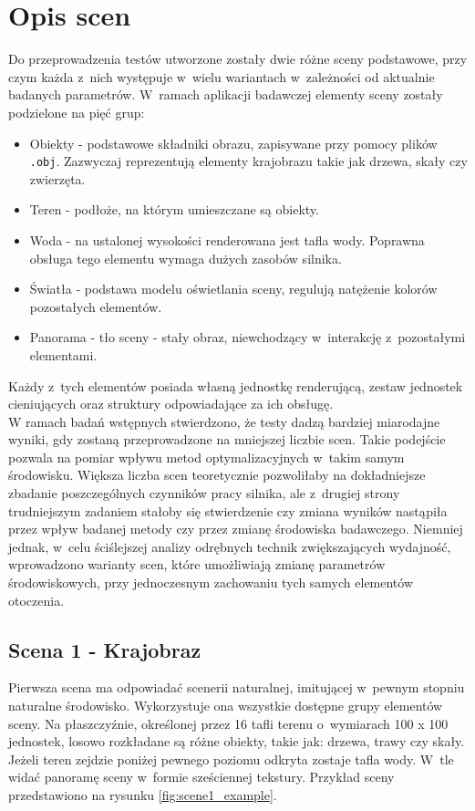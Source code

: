 \documentclass[a4paper,twoside,12pt]{book}
\begin{document}
\section{Opis scen}
Do przeprowadzenia testów utworzone zostały dwie różne sceny podstawowe, przy czym każda z~nich występuje w~wielu wariantach w~zależności od aktualnie badanych parametrów. W~ramach aplikacji badawczej elementy sceny zostały podzielone na pięć grup:
\begin{itemize}
    \item Obiekty - podstawowe składniki obrazu, zapisywane przy pomocy plików \texttt{.obj}. Zazwyczaj reprezentują elementy krajobrazu takie jak drzewa, skały czy zwierzęta.
    \item Teren - podłoże, na którym umieszczane są obiekty.
    \item Woda - na ustalonej wysokości renderowana jest tafla wody. Poprawna obsługa tego elementu wymaga dużych zasobów silnika.
    \item Światła - podstawa modelu oświetlania sceny, regulują natężenie kolorów pozostałych elementów.
    \item Panorama - tło sceny - stały obraz, niewchodzący w~interakcję z~pozostałymi elementami.
\end{itemize}
Każdy z~tych elementów posiada własną jednostkę renderującą, zestaw jednostek cieniujących oraz struktury odpowiadające za ich obsługę. \\
W ramach badań wstępnych stwierdzono, że testy dadzą bardziej miarodajne wyniki, gdy zostaną przeprowadzone na mniejszej liczbie scen. Takie podejście pozwala na pomiar wpływu metod optymalizacyjnych w~takim samym środowisku. Większa liczba scen teoretycznie pozwoliłaby na dokładniejsze zbadanie poszczególnych czynników pracy silnika, ale z~drugiej strony trudniejszym zadaniem stałoby się stwierdzenie czy zmiana wyników nastąpiła przez wpływ badanej metody czy przez zmianę środowiska badawczego. Niemniej jednak, w~celu ściślejszej analizy odrębnych technik zwiększających wydajność, wprowadzono warianty scen, które umożliwiają zmianę parametrów środowiskowych, przy jednoczesnym zachowaniu tych samych elementów otoczenia.

\subsection{Scena 1 - Krajobraz}
Pierwsza scena ma odpowiadać scenerii naturalnej, imitującej w~pewnym stopniu naturalne środowisko. Wykorzystuje ona wszystkie dostępne grupy elementów sceny. Na płaszczyźnie, określonej przez 16 tafli terenu o~wymiarach 100 x 100 jednostek, losowo rozkładane są różne obiekty, takie jak: drzewa, trawy czy skały. Jeżeli teren zejdzie poniżej pewnego poziomu odkryta zostaje tafla wody. W~tle widać panoramę sceny w~formie sześciennej tekstury. Przykład sceny przedstawiono na rysunku \ref{fig:scene1_example}. \\
\end{document}
